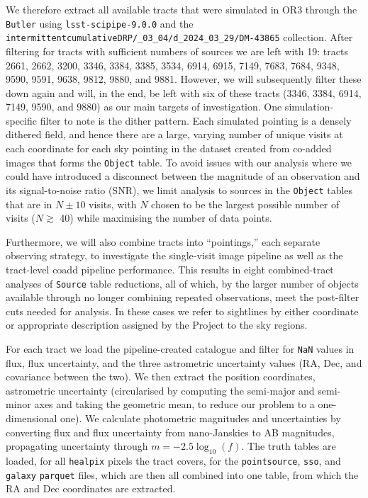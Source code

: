 \documentclass[SE,lsstdraft,authoryear,toc]{lsstdoc}
\begin{document}
We therefore extract all available tracts that were simulated in OR3 through the \texttt{Butler} using \texttt{lsst-scipipe-9.0.0} and the \texttt{intermittentcumulativeDRP/\_03\_04/\allowbreak d\_2024\_03\_29/DM-43865} collection.
After filtering for tracts with sufficient numbers of sources we are left with 19: tracts 2661, 2662, 3200, 3346, 3384, 3385, 3534, 6914, 6915, 7149, 7683, 7684, 9348, 9590, 9591, 9638, 9812, 9880, and 9881.
However, we will subsequently filter these down again and will, in the end, be left with six of these tracts (3346, 3384, 6914, 7149, 9590, and 9880) as our main targets of investigation.
One simulation-specific filter to note is the dither pattern.
Each simulated pointing is a densely dithered field, and hence there are a large, varying number of unique visits at each coordinate for each sky pointing in the dataset created from co-added images that forms the \texttt{Object} table.
To avoid issues with our analysis where we could have introduced a disconnect between the magnitude of an observation and its signal-to-noise ratio (SNR), we limit analysis to sources in the \texttt{Object} tables that are in $N\pm10$ visits, with $N$ chosen to be the largest possible number of visits ($N \gtrsim$ 40) while maximising the number of data points.

Furthermore, we will also combine tracts into ``pointings,'' each separate observing strategy, to investigate the single-visit image pipeline as well as the tract-level coadd pipeline performance.
This results in eight combined-tract analyses of \texttt{Source} table reductions, all of which, by the larger number of objects available through no longer combining repeated observations, meet the post-filter cuts needed for analysis.
In these cases we refer to sightlines by either coordinate or appropriate description assigned by the Project to the sky regions.

For each tract we load the pipeline-created catalogue and filter for \texttt{NaN} values in flux, flux uncertainty, and the three astrometric uncertainty values (RA, Dec, and covariance between the two).
We then extract the position coordinates, astrometric uncertainty (circularised by computing the semi-major and semi-minor axes and taking the geometric mean, to reduce our problem to a one-dimensional one).
We calculate photometric magnitudes and uncertainties by converting flux and flux uncertainty from nano-Janskies to AB magnitudes, propagating uncertainty through $m = - 2.5 \log_{10}(f)$.
The truth tables are loaded, for all \texttt{healpix} pixels the tract covers, for the \texttt{pointsource}, \texttt{sso}, and \texttt{galaxy} \texttt{parquet} files, which are then all combined into one table, from which the RA and Dec coordinates are extracted.
\end{document}
